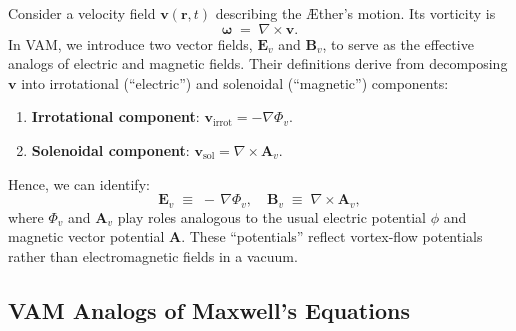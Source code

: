 \documentclass[aps,preprint,superscriptaddress]{revtex4-2}
\begin{document}
    Consider a velocity field \(\mathbf{v}(\mathbf{r},t)\) describing the Æther’s motion. Its vorticity is
    \[
        \boldsymbol{\omega} \;=\; \nabla \times \mathbf{v}.
    \]
    In VAM, we introduce two vector fields, \(\mathbf{E}_v\) and \(\mathbf{B}_v\), to serve as the effective analogs of electric and magnetic fields. Their definitions derive from decomposing \(\mathbf{v}\) into irrotational (“electric”) and solenoidal (“magnetic”) components:

    \begin{enumerate}
        \item \textbf{Irrotational component}: \(\mathbf{v}_{\mathrm{irrot}} = -\nabla \Phi_v\).
        \item \textbf{Solenoidal component}: \(\mathbf{v}_{\mathrm{sol}} = \nabla \times \mathbf{A}_v\).
    \end{enumerate}

    Hence, we can identify:
    \[
        \mathbf{E}_v \;\equiv\; -\,\nabla\Phi_v,
        \quad
        \mathbf{B}_v \;\equiv\; \nabla \times \mathbf{A}_v,
    \]
    where \(\Phi_v\) and \(\mathbf{A}_v\) play roles analogous to the usual electric potential \(\phi\) and magnetic vector potential \(\mathbf{A}\). These “potentials” reflect vortex-flow potentials rather than electromagnetic fields in a vacuum.

    \subsection{VAM Analogs of Maxwell’s Equations}
\end{document}
